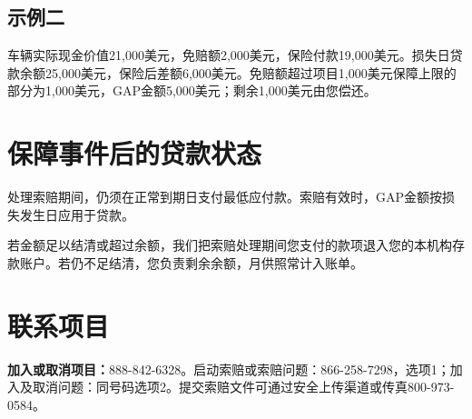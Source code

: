 \documentclass[UTF8,fontset=none,11pt,a4paper]{ctexart}
\begin{document}
\subsection*{示例二}
车辆实际现金价值21,000美元，免赔额2,000美元，保险付款19,000美元。损失日贷款余额25,000美元，保险后差额6,000美元。免赔额超过项目1,000美元保障上限的部分为1,000美元，GAP金额5,000美元；剩余1,000美元\allowbreak\mbox{由您偿还。}


\section*{保障事件后的贷款状态}
处理索赔期间，仍须在正常到期日支付最低应付款。索赔有效时，GAP金额按损失发生日应\allowbreak\mbox{用于贷款。}


若金额足以结清或超过余额，我们把索赔处理期间您支付的款项退入您的本机构存款账户。若仍不足结清，您负责剩余余额，月供照常\allowbreak\mbox{计入账单。}


\section*{联系项目}
\textbf{加入或取消项目：}888-842-6328。启动索赔或索赔问题：866-258-7298，选项1；加入及取消问题：同号码选项2。提交索赔文件可通过安全上传渠道或传真800-973-0584。
\end{document}
